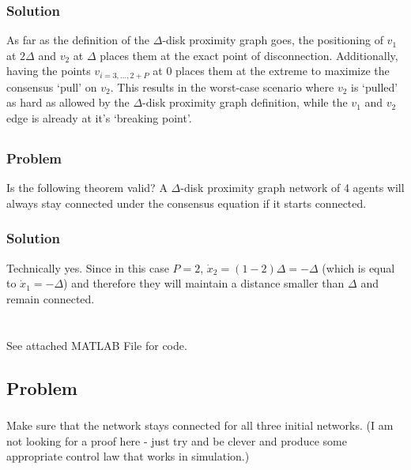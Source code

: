 \documentclass[]{article}
\numberwithin{equation}{section}
\begin{document}
\subsubsection*{Solution}
As far as the definition of the $\Delta$-disk proximity graph goes, the positioning of $v_1$ at $2 \Delta$ and $v_2$ at $\Delta$ places them at the exact point of disconnection. 
Additionally, having the points $v_{i = 3, \dots, 2+P}$ at $0$ places them at the extreme to maximize the consensus `pull' on $v_2$.
This results in the worst-case scenario where $v_2$ is `pulled' as hard as allowed by the $\Delta$-disk proximity graph definition, while the $v_1$ and $v_2$ edge is already at it's `breaking point'.

\subsection{}
\subsubsection*{Problem}
Is the following theorem valid? 
A $\Delta$-disk proximity graph network of 4 agents will always stay connected under the consensus equation if it starts connected.

\subsubsection*{Solution}
Technically yes. 
Since in this case $P=2$, $\dot{x}_2 = (1 - 2) \Delta = - \Delta$ (which is equal to $\dot{x}_1 = - \Delta$) and therefore they will maintain a distance smaller than $\Delta$ and remain connected.





\newpage
\section{}
See attached MATLAB File for code.

\subsection{Problem}
\subsubsection{}
Make sure that the network stays connected for all three initial networks. 
(I am not looking for a proof here - just try and be clever and produce some appropriate control law that works in simulation.)
\end{document}
